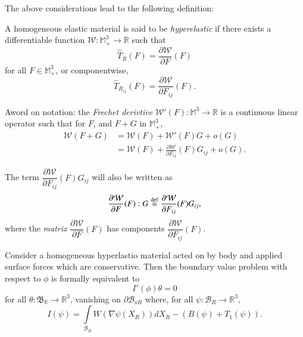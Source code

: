 The above considerations lead to the following definition:

A homogeneous elastic material is said to be
\textit{hyperelastic}  if 
there exists a differentiable function $\mathscr{W} : \mathbb{M}^3_+
\to \mathbb{R}$ such that  
\begin{equation*}
\hat{T}_R (F) = \frac{\partial \mathscr{W}}{\partial F}
(F)\tag{1.4-6}\label{eq1.4-6} 
\end{equation*}
for all $F \in \mathbb{M}^3_+$, or componentwise, 
\begin{equation*}
\hat{T}_{R_{ij}} (F) = \frac{\partial \mathscr{W}}{\partial F_{ij}}
(F). \tag{1.4-7} \label{eq1.4-7} 
\end{equation*}

A\pageoriginale word on notation: the \textit{Frechet derivtive}
$\mathscr{W'}(F) : 
\mathbb{M}^3 \to \mathbb{R}$ is a continuous linear operator such that
for $F$, and $F + G $ in $\mathbb{M}^3_+$,  
\begin{align*}
\mathcal{W}(F+G) & = \mathcal{W}(F) + \mathcal{W}'(F)G + o(G)\\
& = \mathcal{W}(F) + \frac{\partial \mathcal{W}}{\partial F_{ij}}
(F)G_{ij} + o(G).
\end{align*}

The term $\dfrac{\partial \mathcal{W}}{\partial F_{ij}} (F) G_{ij}$
will also be written as  
$$
\frac{\partial \mathcal{W}}{\partial F} (F): G \overset{\operatorname{def}}{=}
\frac{\partial \mathcal{W}}{\partial F_{ij}} (F) G_{ij},  
$$
where the \textit{matrix} $\dfrac{\partial \mathcal{W}}{\partial F}
(F)$ has components $\dfrac{\partial \mathcal{W}}{\partial F_{ij}}
(F)$.  

\begin{theorem}\label{chap1-thm1.4.1}%
Consider a homogeneous hyperlastio material acted on by body and
applied surface forces which are conservative. Then the boundary value
problem with respect to $\phi$ is formally equivalent to  
\begin{equation*}
I'(\phi) \theta = 0 \tag{1.4-8}\label{eq1.4-8}
\end{equation*}
for all $\theta : \mathfrak{B}_\mathbb{R} \to \mathbb{R}^3$, vanishing
on $\partial\mathcal{B}_{oR}$ where, for all $\psi : \mathcal{B}_R \to
\mathbb{R}^3$,  
\begin{equation*}
I(\psi ) = \int\limits_{\mathcal{B}_R} W(\nabla\psi(X_R))dX_R -
(B(\psi) + T_1(\psi)). \tag{1.4-9} \label{eq1.4-9}
\end{equation*}
\end{theorem}

